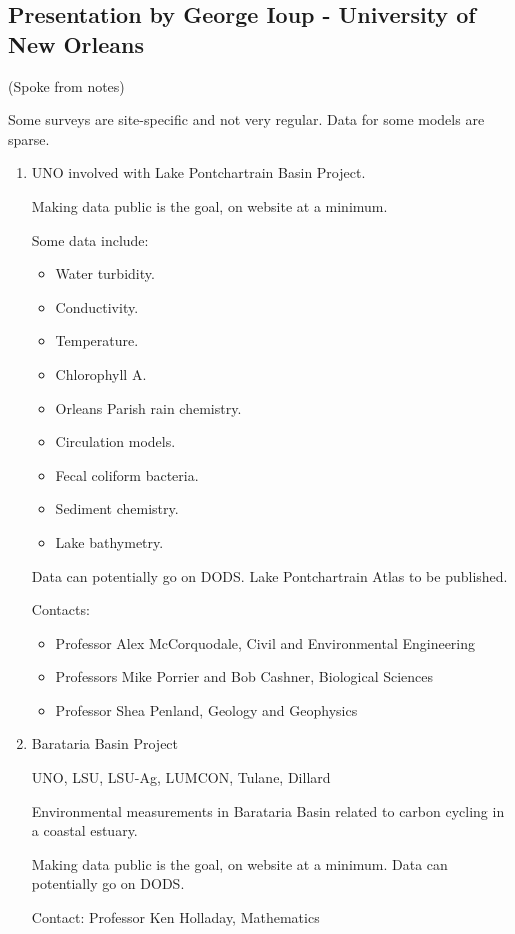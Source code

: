 \subsection{Presentation by George Ioup - University of New Orleans}

(Spoke from notes)

Some surveys are site-specific and not very regular.  Data for some models are sparse.

\begin{enumerate}
\item UNO involved with Lake Pontchartrain Basin Project.
 
Making data public is the goal, on website at a minimum.

Some data include:
\begin{itemize}
\item Water turbidity.
\item Conductivity.
\item Temperature.
\item Chlorophyll A.
\item Orleans Parish rain chemistry.
\item Circulation models.
\item Fecal coliform bacteria.
\item Sediment chemistry.
\item Lake bathymetry.
\end{itemize}

Data can potentially go on DODS.  Lake Pontchartrain Atlas to be published.

Contacts:  
\begin{itemize}
\item Professor Alex McCorquodale, Civil and Environmental Engineering
\item Professors Mike Porrier and Bob Cashner, Biological Sciences
\item Professor Shea Penland, Geology and Geophysics
\end{itemize}

\item Barataria Basin Project

UNO, LSU, LSU-Ag, LUMCON, Tulane, Dillard

Environmental measurements in Barataria Basin related to carbon cycling in a coastal estuary.

Making data public is the goal, on website at a minimum.
Data can potentially go on DODS.

Contact:  Professor Ken Holladay, Mathematics


\end{enumerate}
